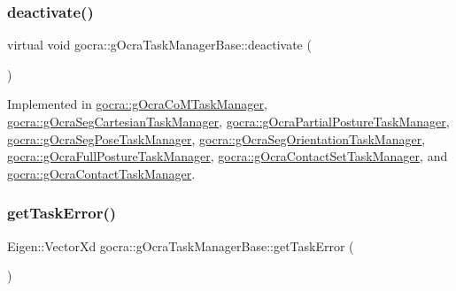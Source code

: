 \hypertarget{classgocra_1_1gOcraTaskManagerBase_a7cf9111e69aee47a39fe0f2976a20d6c}{}\label{classgocra_1_1gOcraTaskManagerBase_a7cf9111e69aee47a39fe0f2976a20d6c} 
\subsubsection{\texorpdfstring{deactivate()}{deactivate()}}
{\footnotesize\ttfamily virtual void gocra\+::g\+Ocra\+Task\+Manager\+Base\+::deactivate (\begin{DoxyParamCaption}{ }\end{DoxyParamCaption})\hspace{0.3cm}{\ttfamily [pure virtual]}}



Implemented in \hyperlink{classgocra_1_1gOcraCoMTaskManager_aec4b5fefd71eabb7ec71d0801a5bbf5f}{gocra\+::g\+Ocra\+Co\+M\+Task\+Manager}, \hyperlink{classgocra_1_1gOcraSegCartesianTaskManager_a0d74a81a6ba05ccbd509aa3362ae59aa}{gocra\+::g\+Ocra\+Seg\+Cartesian\+Task\+Manager}, \hyperlink{classgocra_1_1gOcraPartialPostureTaskManager_a393b7f72db340b4d2bed172fd3f3ae1d}{gocra\+::g\+Ocra\+Partial\+Posture\+Task\+Manager}, \hyperlink{classgocra_1_1gOcraSegPoseTaskManager_ab544efb740604150c99b020a5e1f04de}{gocra\+::g\+Ocra\+Seg\+Pose\+Task\+Manager}, \hyperlink{classgocra_1_1gOcraSegOrientationTaskManager_a5ebf0c1a5813c6a2895965d973f77539}{gocra\+::g\+Ocra\+Seg\+Orientation\+Task\+Manager}, \hyperlink{classgocra_1_1gOcraFullPostureTaskManager_aa53994ddf44ba5d9768ea3d3e5ba9931}{gocra\+::g\+Ocra\+Full\+Posture\+Task\+Manager}, \hyperlink{classgocra_1_1gOcraContactSetTaskManager_ad9f3b44b46253e5539e658cf3fd8ca37}{gocra\+::g\+Ocra\+Contact\+Set\+Task\+Manager}, and \hyperlink{classgocra_1_1gOcraContactTaskManager_adf02de85b4a661c70cd7e2031c1b7500}{gocra\+::g\+Ocra\+Contact\+Task\+Manager}.

\hypertarget{classgocra_1_1gOcraTaskManagerBase_a5c40a14b3a1d5a6519da422310d28f97}{}\label{classgocra_1_1gOcraTaskManagerBase_a5c40a14b3a1d5a6519da422310d28f97} 
\subsubsection{\texorpdfstring{get\+Task\+Error()}{getTaskError()}}
{\footnotesize\ttfamily Eigen\+::\+Vector\+Xd gocra\+::g\+Ocra\+Task\+Manager\+Base\+::get\+Task\+Error (\begin{DoxyParamCaption}{ }\end{DoxyParamCaption})\hspace{0.3cm}{\ttfamily [virtual]}}


